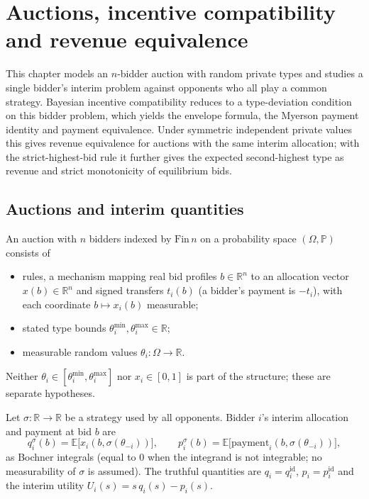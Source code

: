 \chapter{Auctions, incentive compatibility and revenue equivalence}

This chapter models an $n$-bidder auction with random private types and studies a single bidder's interim problem against opponents who all play a common strategy. Bayesian incentive compatibility reduces to a type-deviation condition on this bidder problem, which yields the envelope formula, the Myerson payment identity and payment equivalence. Under symmetric independent private values this gives revenue equivalence for auctions with the same interim allocation; with the strict-highest-bid rule it further gives the expected second-highest type as revenue and strict monotonicity of equilibrium bids.

\section{Auctions and interim quantities}

\begin{definition}\label{def:MathEconLib.Auction}\leanok
{}
An auction with $n$ bidders indexed by $\mathrm{Fin}\,n$ on a probability space $(\Omega,\mathbb{P})$ consists of
\begin{itemize}
\item rules, a mechanism mapping real bid profiles $b\in\mathbb{R}^n$ to an allocation vector $x(b)\in\mathbb{R}^n$ and signed transfers $t_i(b)$ (a bidder's payment is $-t_i$), with each coordinate $b\mapsto x_i(b)$ measurable;
\item stated type bounds $\theta^{\min}_i,\theta^{\max}_i\in\mathbb{R}$;
\item measurable random values $\theta_i:\Omega\to\mathbb{R}$.
\end{itemize}
Neither $\theta_i\in[\theta^{\min}_i,\theta^{\max}_i]$ nor $x_i\in[0,1]$ is part of the structure; these are separate hypotheses.
\end{definition}

\begin{definition}\label{def:MathEconLib.Auction.q_strat}\leanok
{}
Let $\sigma:\mathbb{R}\to\mathbb{R}$ be a strategy used by all opponents. Bidder $i$'s interim allocation and payment at bid $b$ are
\[
q^\sigma_i(b)=\mathbb{E}\bigl[x_i(b,\sigma(\theta_{-i}))\bigr],\qquad p^\sigma_i(b)=\mathbb{E}\bigl[\mathrm{payment}_i(b,\sigma(\theta_{-i}))\bigr],
\]
as Bochner integrals (equal to $0$ when the integrand is not integrable; no measurability of $\sigma$ is assumed). The truthful quantities are $q_i=q^{\mathrm{id}}_i$, $p_i=p^{\mathrm{id}}_i$ and the interim utility $U_i(s)=s\,q_i(s)-p_i(s)$.
\end{definition}

